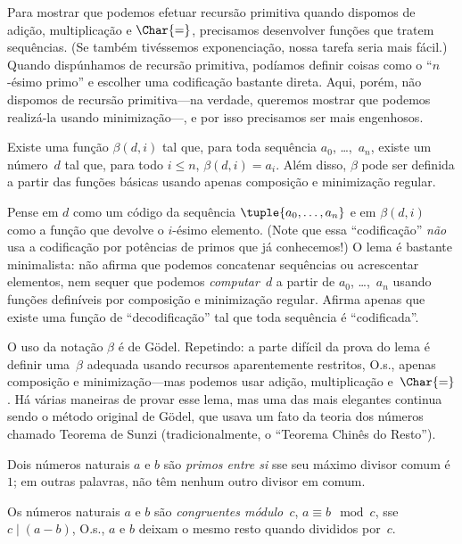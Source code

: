 \documentclass[../../../include/open-logic-section]{subfiles}
\begin{document}


Para mostrar que podemos efetuar recursão primitiva quando dispomos de
adição, multiplicação e $\Char{=}$, precisamos desenvolver funções que
tratem sequências. (Se também tivéssemos exponenciação, nossa tarefa
seria mais fácil.) Quando dispúnhamos de recursão primitiva, podíamos
definir coisas como o ``$n$-ésimo primo'' e escolher uma codificação
bastante direta. Aqui, porém, não dispomos de recursão primitiva---na
verdade, queremos mostrar que podemos realizá-la usando minimização---,
e por isso precisamos ser mais engenhosos.

\begin{lem}
Existe uma função $\beta(d,i)$ tal que, para toda sequência $a_0$,
\dots,~$a_n$, existe um número~$d$ tal que, para todo $i \le n$,
$\beta(d,i) = a_i$. Além disso, $\beta$ pode ser definida a partir das
funções básicas usando apenas composição e minimização regular.
\end{lem}

Pense em $d$ como um código da sequência $\tuple{a_0, \dots, a_n}$ e
em $\beta(d,i)$ como a função que devolve o $i$-ésimo elemento. (Note
que essa ``codificação'' \emph{não} usa a codificação por potências de
primos que já conhecemos!) O lema é bastante minimalista: não afirma
que podemos concatenar sequências ou acrescentar elementos, nem sequer
que podemos \emph{computar}~$d$ a partir de $a_0$, \dots,~$a_n$ usando
funções definíveis por composição e minimização regular. Afirma apenas
que existe uma função de ``decodificação'' tal que toda sequência é
``codificada''.

O uso da notação $\beta$ é de G\"odel. Repetindo: a parte difícil da
prova do lema é definir uma~$\beta$ adequada usando recursos
aparentemente restritos, O.s.\@, apenas composição e minimização---mas
podemos usar adição, multiplicação e~$\Char{=}$. Há várias maneiras de
provar esse lema, mas uma das mais elegantes continua sendo o método
original de G\"odel, que usava um fato da teoria dos números chamado
Teorema de Sunzi (tradicionalmente, o ``Teorema Chinês do Resto'').

\begin{defn}
Dois números naturais $a$ e $b$ são \emph{primos entre si} sse seu
máximo divisor comum é~$1$; em outras palavras, não têm nenhum outro
divisor em comum.
\end{defn}

\begin{defn}
Os números naturais $a$ e $b$ são \emph{congruentes módulo~$c$},
$a \equiv b \mod c$, sse $c \mid (a-b)$, O.s.\@, $a$ e $b$ deixam o
mesmo resto quando divididos por~$c$.
\end{defn}
\end{document}
